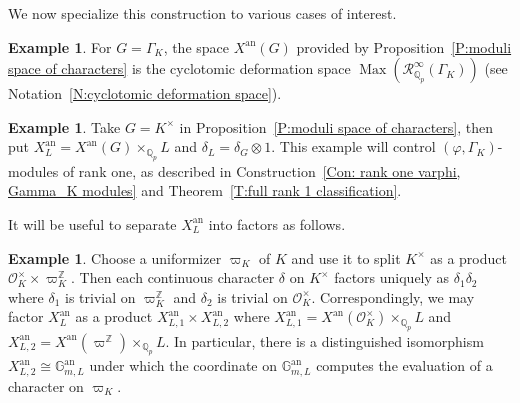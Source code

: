 \documentclass[12pt]{article}
\theoremstyle{definition}
\newtheorem{example}[theorem]{Example}
\numberwithin{equation}{theorem}
\newcommand{\calO}{\mathcal{O}}
\newcommand{\calR}{\mathcal{R}}
\newcommand{\QQ}{\mathbb{Q}}
\newcommand{\ZZ}{\mathbb{Z}}
\newcommand{\an}{\mathrm{an}}
\def\Qp{\QQ_p}
\DeclareMathOperator{\Max}{Max}
\begin{document}
We now specialize this construction to various cases of interest.

\begin{example} \label{E:cyclotomic deformation space}
For $G = \Gamma_K$, the space $X^{\an}(G)$ provided by Proposition~\ref{P:moduli space of characters} is the cyclotomic deformation space $\Max(\calR_{\Qp}^\infty(\Gamma_K))$ (see Notation~\ref{N:cyclotomic deformation space}).
\end{example}

\begin{example} \label{E:moduli space of characters}
Take $G = K^\times$ in Proposition~\ref{P:moduli space of characters},
then put $X^\an_L = X^\an(G) \times_{\Qp} L$ and $\delta_L =
\delta_{G} \otimes 1$. This example will control $(\varphi, \Gamma_K)$-modules of rank one, as described in Construction~\ref{Con: rank one varphi, Gamma_K modules} and Theorem~\ref{T:full rank 1 classification}.
\end{example}

It will be useful to separate $X^{\an}_L$ into factors as follows.

\begin{example}  \label{E:factorization of characters}
Choose a uniformizer $\varpi_K$ of $K$ and use it to split $K^\times$ as a product $\calO_K^\times \times \varpi_K^\ZZ$. 
Then each continuous character $\delta$ on $K^\times$ factors uniquely as $\delta_1 \delta_2$ where $\delta_1$ is trivial on $\varpi_K^\ZZ$
and $\delta_2$ is trivial on $\calO_K^\times$. Correspondingly,
we may factor $X^{\an}_L$ as a product $X^{\an}_{L,1} \times X^{\an}_{L,2}$ where
$X^{\an}_{L,1} = X^{\an}(\calO_K^\times) \times_{\Qp} L$ and $X^{\an}_{L,2} = X^{\an}(\varpi^\ZZ) \times_{\Qp} L$.
In particular, there is a distinguished isomorphism $X^{\an}_{L,2} \cong \mathbb{G}^{\an}_{m,L}$ under which the coordinate on $\mathbb{G}^{\an}_{m,L}$ computes the evaluation of a character on $\varpi_K$.
\end{example}
\end{document}
